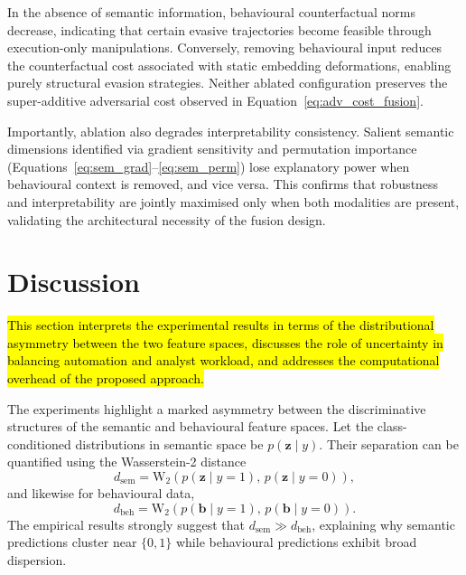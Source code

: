 \documentclass[3p]{elsarticle}
\begin{document}
In the absence of semantic information, behavioural counterfactual norms decrease, indicating that certain evasive trajectories become feasible through execution-only manipulations. Conversely, removing behavioural input reduces the counterfactual cost associated with static embedding deformations, enabling purely structural evasion strategies. Neither ablated configuration preserves the super-additive adversarial cost observed in Equation~\eqref{eq:adv_cost_fusion}.

Importantly, ablation also degrades interpretability consistency. Salient semantic dimensions identified via gradient sensitivity and permutation importance (Equations~\eqref{eq:sem_grad}--\eqref{eq:sem_perm}) lose explanatory power when behavioural context is removed, and vice versa.
This confirms that robustness and interpretability are jointly maximised only when both modalities are present, validating the architectural necessity of the fusion design.

\section{Discussion}
\label{sec:discussion}

\hl{This section interprets the experimental results in terms of the distributional asymmetry
between the two feature spaces, discusses the role of uncertainty in balancing automation
and analyst workload, and addresses the computational overhead of the proposed approach.}

The experiments highlight a marked asymmetry between the discriminative structures of the semantic and behavioural feature spaces. Let the class-conditioned distributions in semantic space be \(p(\mathbf{z}\mid y)\). Their separation can be quantified using the Wasserstein-2 distance
\begin{equation}
d_{\mathrm{sem}}
= \mathrm{W}_2\!\left(p(\mathbf{z}\mid y=1),\, p(\mathbf{z}\mid y=0)\right),
\label{eq:wass_sem}
\end{equation}
and likewise for behavioural data,
\begin{equation}
d_{\mathrm{beh}}
= \mathrm{W}_2\!\left(p(\mathbf{b}\mid y=1),\, p(\mathbf{b}\mid y=0)\right).
\label{eq:wass_beh}
\end{equation}
The empirical results strongly suggest that \(d_{\mathrm{sem}} \gg d_{\mathrm{beh}}\), explaining why semantic predictions cluster near \(\{0,1\}\) while behavioural predictions exhibit broad dispersion.
\end{document}
